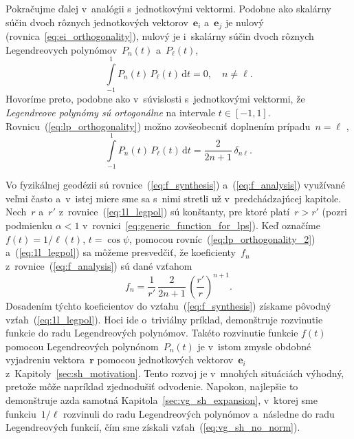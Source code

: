 \documentclass[a4paper, 12pt]{book}
\newcommand{\diff}{\mathrm d}
\let\vec\mathbf
\begin{document}
Pokračujme ďalej v~analógii s~jednotkovými vektormi.  Podobne ako skalárny 
súčin dvoch rôznych jednotkových vektorov~$\vec e_i$ a~$ \vec e_j$ je nulový 
(rovnica~\ref{eq:ei_orthogonality}), nulový je i~skalárny súčin dvoch rôznych 
Legendreovych polynómov~$P_n(t)$ a~$P_\ell(t)$,
%
\begin{equation}
\label{eq:lp_orthogonality}
\int\limits_{-1}^1 P_n(t) \, P_\ell(t) \, \diff t = 0{,} \quad n \neq \ell{.}
\end{equation}
%
Hovoríme preto, podobne ako v~súvislosti s~jednotkovými vektormi, že
\emph{Legendreove polynómy sú ortogonálne} na intervale $t \in [-1, 1].$
Rovnicu~(\ref{eq:lp_orthogonality}) možno zovšeobecniť doplnením prípadu~$n
= \ell$ \parencite[napríklad][]{Hobson},
%
\begin{equation}
\label{eq:lp_orthogonality_2}
\int\limits_{-1}^1 P_n(t) \, P_\ell(t) \, \diff t = \frac{2}{2n + 1} \, 
\delta_{n\ell}{.}
\end{equation}

Vo fyzikálnej geodézii sú rovnice~(\ref{eq:f_synthesis}) 
a~(\ref{eq:f_analysis}) využívané veľmi často a~v~istej miere sme sa s~nimi 
stretli už v~predchádzajúcej kapitole.  Nech~$r$ a~$r'$ 
z~rovnice~(\ref{eq:1l_legpol}) sú konštanty, pre ktoré platí~$r > r'$ (pozri 
podmienku $\alpha < 1$ v~rovnici~\ref{eq:generic_function_for_lps}).  Keď 
označíme $f(t) = 1 \slash \ell(t)$, $t = \cos\psi$, pomocou 
rovníc~(\ref{eq:lp_orthogonality_2}) a~(\ref{eq:1l_legpol}) sa môžeme 
presvedčiť, že koeficienty~$f_n$ z~rovnice~(\ref{eq:f_analysis}) sú dané 
vzťahom
%
\begin{equation}
f_n = \frac{1}{r'} \, \frac{2}{2n + 1} \, \left( \frac{r'}{r} \right)^{n
+ 1}{.}
\end{equation}
%
Dosadením týchto koeficientov do vzťahu~(\ref{eq:f_synthesis}) získame pôvodný 
vzťah~(\ref{eq:1l_legpol}).  Hoci ide o~triviálny príklad, demonštruje 
rozvinutie funkcie do radu Legendreových polynómov.  Takéto rozvinutie funkcie 
$f(t)$ pomocou Legendreových polynónom~$P_n(t)$ je v~istom zmysle obdobné 
vyjadreniu vektora~$\vec r$ pomocou jednotkových vektorov~$\vec e_i$ 
z~Kapitoly~\ref{sec:sh_motivation}.  Tento rozvoj je v~mnohých situáciách 
výhodný, pretože môže napríklad zjednodušiť odvodenie.  Napokon, najlepšie to 
demonštruje azda samotná Kapitola~\ref{sec:vg_sh_expansion}, v~ktorej sme 
funkciu~$1 \slash \ell$ rozvinuli do radu Legendreových polynómov a~následne do 
radu Legendreových funkcií, čím sme získali vzťah~(\ref{eq:vg_sh_no_norm}).
\end{document}
